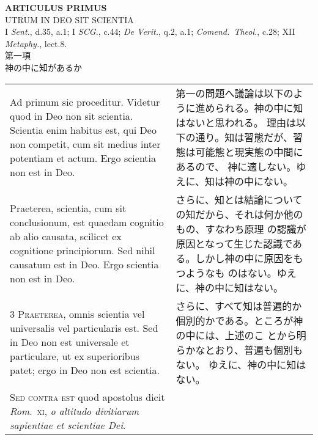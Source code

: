\documentclass[10pt]{jsarticle} %
\begin{document}
\newpage
{}
\begin{center}
{\Large {\bfseries ARTICULUS PRIMUS}}\\
{\large UTRUM IN DEO SIT SCIENTIA}\\
{\footnotesize I {\itshape Sent.}, d.35, a.1; I {\itshape SCG.}, c.44; {\itshape De Verit.}, q.2, a.1; {\itshape Comend.~Theol.}, c.28; XII {\itshape Metaphy.}, lect.8.}\\
{\Large 第一項\\神の中に知があるか}
\end{center}

\begin{longtable}{p{21em}p{21em}}

{\huge A}{\sc d primum sic proceditur}. 
Videtur quod in Deo non sit scientia. Scientia enim habitus est, qui Deo
 non competit, cum sit medius inter potentiam et actum. Ergo scientia
 non est in Deo.

&

第一の問題へ議論は以下のように進められる。神の中に知はないと思われる。
理由は以下の通り。知は習態だが、習態は可能態と現実態の中間にあるので、
神に適しない。ゆえに、知は神の中にない。

\\

{\sc 2 Praeterea}, scientia, cum sit conclusionum, est quaedam
cognitio ab alio causata, scilicet ex cognitione principiorum. Sed
nihil causatum est in Deo. Ergo scientia non est in Deo.

&

さらに、知とは結論についての知だから、それは何か他のもの、すなわち原理
の認識が原因となって生じた認識である。しかし神の中に原因をもつようなも
のはない。ゆえに、神の中に知はない。

\\

{\scshape 3 Praeterea}, omnis scientia vel universalis vel
particularis est. Sed in Deo non est universale et particulare, ut ex
superioribus patet; ergo in Deo non est scientia.

&

さらに、すべて知は普遍的か個別的かである。ところが神の中には、上述のこ
とから明らかなとおり、普遍も個別もない。 ゆえに、神の中に知はない。

\\


{\scshape Sed contra est} quod apostolus dicit {\itshape
Rom}.~{\scshape xi}, {\itshape o altitudo divitiarum sapientiae et
scientiae Dei}.


\end{longtable}
\end{document}
